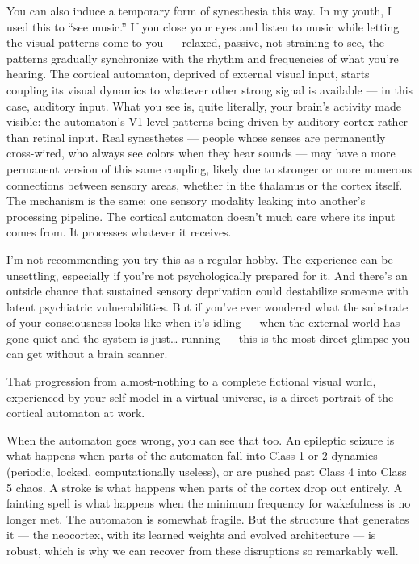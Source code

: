 \documentclass[11pt, twoside, openright]{book}
\begin{document}
You can also induce a temporary form of synesthesia this way. In my youth, I used this to ``see music.'' If you close your eyes and listen to music while letting the visual patterns come to you --- relaxed, passive, not straining to see, the patterns gradually synchronize with the rhythm and frequencies of what you're hearing. The cortical automaton, deprived of external visual input, starts coupling its visual dynamics to whatever other strong signal is available --- in this case, auditory input. What you see is, quite literally, your brain's activity made visible: the automaton's V1-level patterns being driven by auditory cortex rather than retinal input. Real synesthetes --- people whose senses are permanently cross-wired, who always see colors when they hear sounds --- may have a more permanent version of this same coupling, likely due to stronger or more numerous connections between sensory areas, whether in the thalamus or the cortex itself. The mechanism is the same: one sensory modality leaking into another's processing pipeline. The cortical automaton doesn't much care where its input comes from. It processes whatever it receives.

I'm not recommending you try this as a regular hobby. The experience can be unsettling, especially if you're not psychologically prepared for it. And there's an outside chance that sustained sensory deprivation could destabilize someone with latent psychiatric vulnerabilities. But if you've ever wondered what the substrate of your consciousness looks like when it's idling --- when the external world has gone quiet and the system is just… running --- this is the most direct glimpse you can get without a brain scanner.

That progression from almost-nothing to a complete fictional visual world, experienced by your self-model in a virtual universe, is a direct portrait of the cortical automaton at work.

When the automaton goes wrong, you can see that too. An epileptic seizure is what happens when parts of the automaton fall into Class 1 or 2 dynamics (periodic, locked, computationally useless), or are pushed past Class 4 into Class 5 chaos. A stroke is what happens when parts of the cortex drop out entirely. A fainting spell is what happens when the minimum frequency for wakefulness is no longer met. The automaton is somewhat fragile. But the structure that generates it --- the neocortex, with its learned weights and evolved architecture --- is robust, which is why we can recover from these disruptions so remarkably well.
\end{document}
